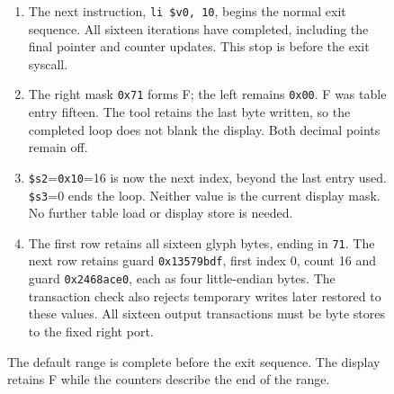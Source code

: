 \begin{figure}[htbp]
  \par\smallskip
  \begin{minipage}{\linewidth}
    \small
    \begin{enumerate}
      \item The next instruction, \texttt{li \$v0, 10}, begins the normal exit sequence. All sixteen iterations have completed, including the final pointer and counter updates. This stop is before the exit syscall.
      \item The right mask \texttt{0x71} forms F; the left remains \texttt{0x00}. F was table entry fifteen. The tool retains the last byte written, so the completed loop does not blank the display. Both decimal points remain off.
      \item \texttt{\$s2}=\texttt{0x10}=16 is now the next index, beyond the last entry used. \texttt{\$s3}=0 ends the loop. Neither value is the current display mask. No further table load or display store is needed.
      \item The first row retains all sixteen glyph bytes, ending in \texttt{71}. The next row retains guard \texttt{0x13579bdf}, first index 0, count 16 and guard \texttt{0x2468ace0}, each as four little-endian bytes. The transaction check also rejects temporary writes later restored to these values. All sixteen output transactions must be byte stores to the fixed right port.
    \end{enumerate}
  \end{minipage}
  \caption{The default range is complete before the exit sequence. The display retains F while the counters describe the end of the range.}
  \label{capture:005-seven-segment-counter-f04-final-f}
\end{figure}
\par
